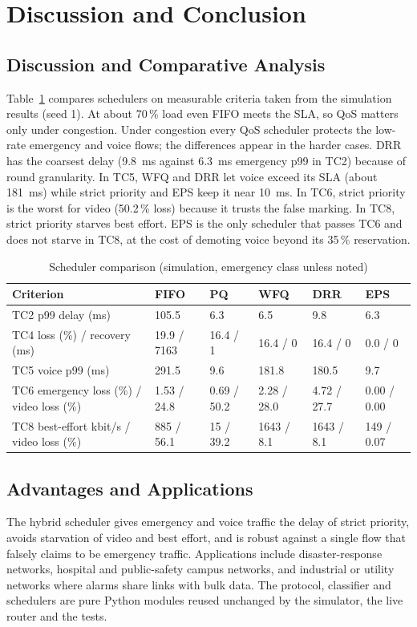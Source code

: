 \documentclass[12pt,a4paper]{article}
\begin{document}
\section{Discussion and Conclusion}

\subsection{Discussion and Comparative Analysis}
Table~\ref{tab:compare} compares schedulers on measurable criteria taken from the simulation
results (seed 1). At about 70\,\% load even FIFO meets the SLA, so QoS matters only under
congestion. Under congestion every QoS scheduler protects the low-rate emergency and voice flows;
the differences appear in the harder cases. DRR has the coarsest delay (9.8~ms against 6.3~ms
emergency p99 in TC2) because of round granularity. In TC5, WFQ and DRR let voice exceed its SLA
(about 181~ms) while strict priority and EPS keep it near 10~ms. In TC6, strict priority is the
worst for video (50.2\,\% loss) because it trusts the false marking. In TC8, strict priority
starves best effort. EPS is the only scheduler that passes TC6 and does not starve in TC8, at the
cost of demoting voice beyond its 35\,\% reservation.

\begin{table}[H]\centering\small
\caption{Scheduler comparison (simulation, emergency class unless noted)}\label{tab:compare}
\begin{tabularx}{\textwidth}{|l|X|X|X|X|X|}\hline
\textbf{Criterion} & \textbf{FIFO} & \textbf{PQ} & \textbf{WFQ} & \textbf{DRR} & \textbf{EPS}\\\hline
TC2 p99 delay (ms) & 105.5 & 6.3 & 6.5 & 9.8 & 6.3\\\hline
TC4 loss (\%) / recovery (ms) & 19.9 / 7163 & 16.4 / 1 & 16.4 / 0 & 16.4 / 0 & 0.0 / 0\\\hline
TC5 voice p99 (ms) & 291.5 & 9.6 & 181.8 & 180.5 & 9.7\\\hline
TC6 emergency loss (\%) / video loss (\%) & 1.53 / 24.8 & 0.69 / 50.2 & 2.28 / 28.0 & 4.72 / 27.7 & 0.00 / 0.00\\\hline
TC8 best-effort kbit/s / video loss (\%) & 885 / 56.1 & 15 / 39.2 & 1643 / 8.1 & 1643 / 8.1 & 149 / 0.07\\\hline
\end{tabularx}
\end{table}

\subsection{Advantages and Applications}
The hybrid scheduler gives emergency and voice traffic the delay of strict priority, avoids
starvation of video and best effort, and is robust against a single flow that falsely claims to be
emergency traffic. Applications include disaster-response networks, hospital and public-safety
campus networks, and industrial or utility networks where alarms share links with bulk data. The
protocol, classifier and schedulers are pure Python modules reused unchanged by the simulator, the
live router and the tests.
\end{document}
